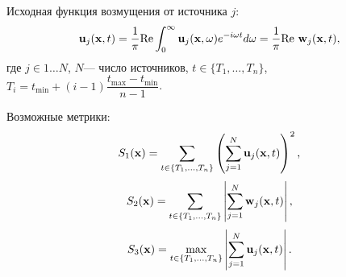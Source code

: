 \documentclass[a4paper, 12pt]{article}
\begin{document}
    
Исходная функция возмущения от источника $j$:
\begin{equation*}
    {\bf u}_j({\bf x},t)=\dfrac{1}{\pi} \mathrm{Re} \int_{0}^{\infty} {\bf u}_j({\bf x},\omega) e^{- i \omega t}d\omega=\dfrac{1}{\pi} \mathrm{Re}\ {\bf w}_j ({\bf x},t),
\end{equation*}
где $j \in 1\dots N$, $N$--- число источников, $t \in \{T_1,\dots,T_n\}$, $T_i=t_{\min}+(i-1)\dfrac{t_{\max}-t_{\min}}{n-1}$.

Возможные метрики:
\begin{equation}
    S_1({\bf x} )= \sum_{t \in \{T_1,\dots,T_n\}} \left(\sum_{j=1}^N {\bf u}_j ({\bf x},t)\right)^2 ,
\end{equation}
\begin{equation}
    S_2({\bf x})= \sum_{t \in \{T_1,\dots,T_n\}} \left|\sum_{j=1}^N {\bf w}_j({\bf x},t)\right|,
\end{equation}
\begin{equation}
    S_3({\bf x})= \max_{t \in \{T_1,\dots,T_n\}} \left|\sum_{j=1}^N {\bf u}_j ({\bf x},t)\right|.
\end{equation}
\end{document}

